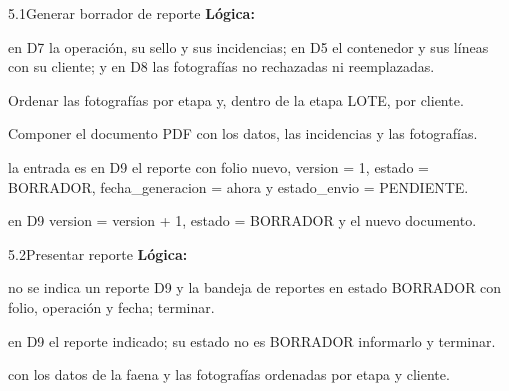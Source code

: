 \begin{minispec}{5.1}{Generar borrador de reporte}
\textbf{Lógica:}
\begin{logica}
    \item {} en D7 la operación, su sello y sus incidencias; en D5 el contenedor y sus
    líneas con su cliente; y en D8 las fotografías no rechazadas ni reemplazadas.
    \item Ordenar las fotografías por etapa y, dentro de la etapa LOTE, por cliente.
    \item Componer el documento PDF con los datos, las incidencias y las fotografías.
    \item {} la entrada es   en D9 el
    reporte con folio nuevo, version = 1, estado = BORRADOR, fecha\_generacion = ahora y
    estado\_envio = PENDIENTE.
    \item {}  en D9 version = version + 1, estado = BORRADOR y el nuevo
    documento.
\end{logica}
\end{minispec}

\begin{minispec}{5.2}{Presentar reporte}
\textbf{Lógica:}
\begin{logica}
    \item {} no se indica un reporte  D9 y  la bandeja de
    reportes en estado BORRADOR con folio, operación y fecha; terminar.
    \item {} en D9 el reporte indicado;  su estado no es BORRADOR 
    informarlo y terminar.
    \item {}  con los datos de la faena y las fotografías
    ordenadas por etapa y cliente.
\end{logica}
\end{minispec}

